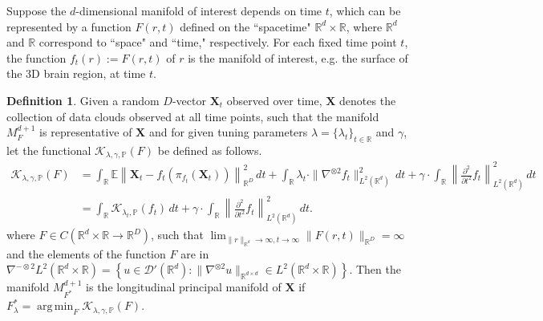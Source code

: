 \documentclass[11pt,reqno]{article}
\DeclareMathOperator*{\argmin}{arg\,min}
\theoremstyle{definition}
\newtheorem{definition}{Definition}
\begin{document}
Suppose the $d$-dimensional manifold of interest depends on time $t$, which can be represented by a function $F(r,t)$ defined on the ``spacetime" $\mathbb{R}^d\times\mathbb{R}$, where $\mathbb{R}^d$ and $\mathbb{R}$ correspond to ``space" and ``time," respectively. For each fixed time point $t$, the function $f_t(r):=F(r,t)$ of $r$ is the manifold of interest, e.g. the surface of the 3D brain region, at time $t$.
\begin{definition}
  \label{def:lpme} Given a random $D$-vector $\boldsymbol{X}_t$ observed over time, $\boldsymbol{X}$ denotes the collection of data clouds observed at all time points, such that the manifold $M_F^{d+1}$ is representative of $\boldsymbol{X}$ and for given tuning parameters $\lambda=\{\lambda_t\}_{t\in\mathbb{R}}$ and $\gamma$, let the functional $\mathcal{K}_{\lambda, \gamma, \mathbb{P}}(F)$ be defined as follows.
\begin{align}\label{eq:newKappa}
  \mathcal{K}_{\lambda, \gamma, \mathbb{P}}(F) &= \int_\mathbb{R} \mathbb{E}\left\|\boldsymbol{X}_t - f_t\left(\pi_{f_t}(\boldsymbol{X}_t)\right)\right\|_{\mathbb{R}^{D}}^2 \, dt + \int_\mathbb{R} \lambda_t \cdot\|\nabla^{\otimes 2}f_t\|_{L^2(\mathbb{R}^{d})}^2 \, dt + \gamma\cdot \int_{\mathbb{R}}\left\|\frac{\partial^2}{\partial t^2}f_t\right\|_{L^2(\mathbb{R}^d)}^2 \, dt \\
  &= \int_{\mathbb{R}}\mathcal{K}_{\lambda_t, \mathbb{P}}(f_t) \, dt + \gamma \cdot \int_{\mathbb{R}}\left\|\frac{\partial^2}{\partial t^2}f_t\right\|_{L^2(\mathbb{R}^d)}^2 \, dt. \nonumber
\end{align}
where $F \in C(\mathbb{R}^{d}\times\mathbb{R} \to \mathbb{R}^{D})$, such that $\lim_{\|r\|_{\mathbb{R}^{d}} \to \infty, t \to \infty}\|F(r,t)\|_{\mathbb{R}^{D}} = \infty$ and the elements of the function $F$ are in $\nabla^{-\otimes 2}L^2(\mathbb{R}^{d}\times\mathbb{R}) = \left\{u \in \mathcal{D}'(\mathbb{R}^{d}): \|\nabla^{\otimes 2} u\|_{\mathbb{R}^{d \times d}} \in L^2(\mathbb{R}^{d}\times\mathbb{R})\right\}$. Then the manifold $M_{F^{*}}^{d+1}$ is the longitudinal principal manifold of $\boldsymbol{X}$ if $F_{\lambda}^{*} = \argmin_{F}\mathcal{K}_{\lambda, \gamma, \mathbb{P}}(F)$.
\end{definition}
\end{document}
